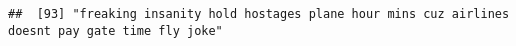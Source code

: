 \documentclass[
]{article}
\begin{document}
\begin{verbatim}
##  [93] "freaking insanity hold hostages plane hour mins cuz airlines doesnt pay gate time fly joke"                                                                                                                                                                                                                                                                                                                                                                                                                                                                                                                                                                                                                                                                                                                                                                                                                                                                                                                                                                                                                                                                                                                                                                                                                                                                                                                                                                                                                                                                                                                                                                                                                                                                                                    

\end{verbatim}
\end{document}

